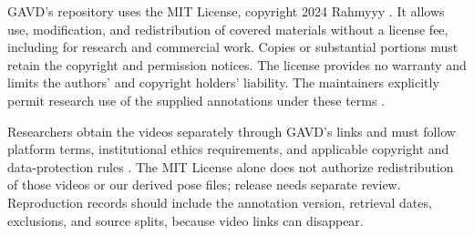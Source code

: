 \documentclass{article}
\begin{document}
GAVD's repository uses the MIT License, copyright 2024 Rahmyyy \citep{ref16}. It allows use, modification, and redistribution of covered materials without a license fee, including for research and commercial work. Copies or substantial portions must retain the copyright and permission notices. The license provides no warranty and limits the authors' and copyright holders' liability. The maintainers explicitly permit research use of the supplied annotations under these terms \citep{ref15}.

Researchers obtain the videos separately through GAVD's links and must follow platform terms, institutional ethics requirements, and applicable copyright and data-protection rules \citep{ref15}. The MIT License alone does not authorize redistribution of those videos or our derived pose files; release needs separate review. Reproduction records should include the annotation version, retrieval dates, exclusions, and source splits, because video links can disappear.
\end{document}
